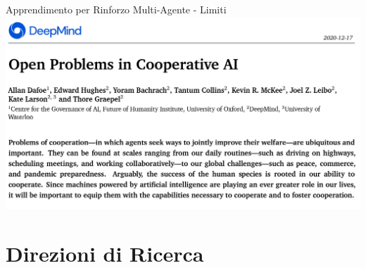 \documentclass[presentation, 10pt,aspectratio=169]{beamer}\mode<presentation>{\usetheme{AMSBolognaFC}}
\begin{document}
\begin{frame}{Apprendimento per Rinforzo Multi-Agente - Limiti}
	\href{https://arxiv.org/abs/2012.08630}{
	\includegraphics[width=\textwidth]{img/cooperative-ai.png}}
\end{frame}

\section{Direzioni di Ricerca}
\end{document}
